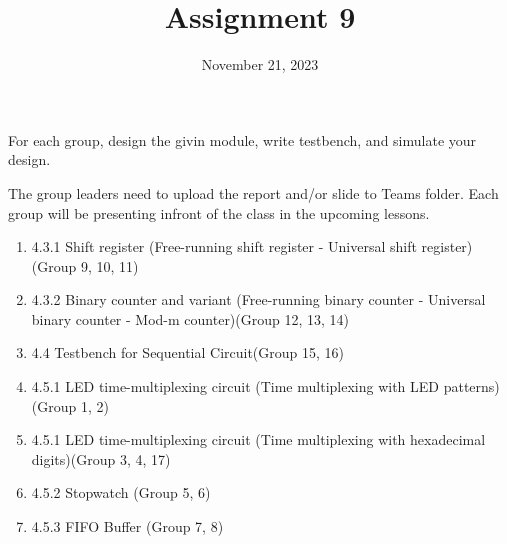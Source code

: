 \documentclass{vhdl-assignment}
\title{Assignment 9}
\date{November 21, 2023}
\begin{document}
\maketitle
\thispagestyle{fancy}

For each group, design the givin module, write testbench, and simulate your design.

The group leaders need to upload the report and/or slide to Teams folder. Each group will be presenting infront of the class in the upcoming lessons.

\begin{enumerate}
    \item 4.3.1 Shift register (Free-running shift register - Universal shift register) (Group 9, 10, 11)
    \item 4.3.2 Binary counter and variant (Free-running binary counter - Universal binary counter - Mod-m counter)(Group 12, 13, 14)
    \item 4.4 Testbench for Sequential Circuit(Group 15, 16)
    \item 4.5.1 LED time-multiplexing circuit (Time multiplexing with LED patterns)(Group 1, 2)
    \item 4.5.1 LED time-multiplexing circuit (Time multiplexing with hexadecimal digits)(Group 3, 4, 17)
    \item 4.5.2 Stopwatch (Group 5, 6)
    \item 4.5.3 FIFO Buffer (Group 7, 8)
\end{enumerate}

\end{document}
